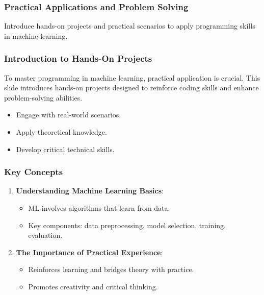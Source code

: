 \documentclass{beamer}
\begin{document}
\begin{frame}
    \frametitle{Practical Applications and Problem Solving}
    Introduce hands-on projects and practical scenarios to apply programming skills in machine learning.
\end{frame}

\begin{frame}
    \frametitle{Introduction to Hands-On Projects}
    To master programming in machine learning, practical application is crucial. This slide introduces hands-on projects designed to reinforce coding skills and enhance problem-solving abilities. 
    \begin{itemize}
        \item Engage with real-world scenarios.
        \item Apply theoretical knowledge.
        \item Develop critical technical skills.
    \end{itemize}
\end{frame}

\begin{frame}
    \frametitle{Key Concepts}
    \begin{enumerate}
        \item \textbf{Understanding Machine Learning Basics}:
        \begin{itemize}
            \item ML involves algorithms that learn from data.
            \item Key components: data preprocessing, model selection, training, evaluation.
        \end{itemize}
        
        \item \textbf{The Importance of Practical Experience}:
        \begin{itemize}
            \item Reinforces learning and bridges theory with practice.
            \item Promotes creativity and critical thinking.
        \end{itemize}
    \end{enumerate}
\end{frame}
\end{document}
